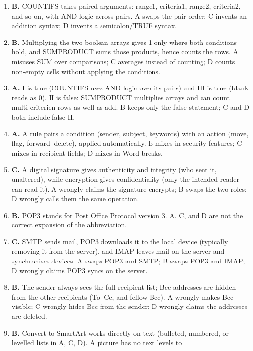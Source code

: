 \begin{enumerate}[label=\textbf{Q\arabic*.}, leftmargin=*]
  \texttt{\#VALUE!}. A is wrong (no numeric result exists); B is wrong
  (ISNUMBER returns FALSE for text); D overstates the rule (text is not
  silently zero in arithmetic).
\item \textbf{B.} COUNTIFS takes paired arguments: range1, criteria1, range2,
  criteria2, and so on, with AND logic across pairs. A swaps the pair order;
  C invents an addition syntax; D invents a semicolon/TRUE syntax.
\item \textbf{B.} Multiplying the two boolean arrays gives 1 only where both
  conditions hold, and SUMPRODUCT sums those products, hence counts the rows.
  A misuses SUM over comparisons; C averages instead of counting; D counts
  non-empty cells without applying the conditions.
\item \textbf{A.} I is true (COUNTIFS uses AND logic over its pairs) and III
  is true (blank reads as 0). II is false: SUMPRODUCT multiplies arrays and
  can count multi-criterion rows as well as add. B keeps only the false
  statement; C and D both include false II.
\item \textbf{A.} A rule pairs a condition (sender, subject, keywords) with an
  action (move, flag, forward, delete), applied automatically. B mixes in
  security features; C mixes in recipient fields; D mixes in Word breaks.
\item \textbf{C.} A digital signature gives authenticity and integrity (who
  sent it, unaltered), while encryption gives confidentiality (only the
  intended reader can read it). A wrongly claims the signature encrypts; B
  swaps the two roles; D wrongly calls them the same operation.
\item \textbf{B.} POP3 stands for Post Office Protocol version 3. A, C, and D
  are not the correct expansion of the abbreviation.
\item \textbf{C.} SMTP sends mail, POP3 downloads it to the local device
  (typically removing it from the server), and IMAP leaves mail on the server
  and synchronises devices. A swaps POP3 and SMTP; B swaps POP3 and IMAP; D
  wrongly claims POP3 syncs on the server.
\item \textbf{B.} The sender always sees the full recipient list; Bcc addresses
  are hidden from the other recipients (To, Cc, and fellow Bcc). A wrongly
  makes Bcc visible; C wrongly hides Bcc from the sender; D wrongly claims the
  addresses are deleted.
\item \textbf{B.} Convert to SmartArt works directly on text (bulleted,
  numbered, or levelled lists in A, C, D). A picture has no text levels to

\end{enumerate}

